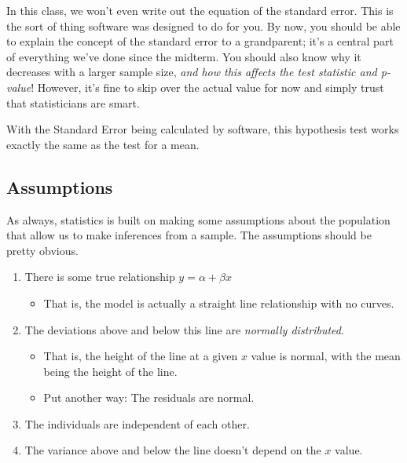 \documentclass[
  letterpaper,
  DIV=11,
  numbers=noendperiod]{scrreprt}
\providecommand{\tightlist}{%
  \setlength{\itemsep}{0pt}\setlength{\parskip}{0pt}}\usepackage{longtable,booktabs,array}
\begin{document}
In this class, we won't even write out the equation of the standard
error. This is the sort of thing software was designed to do for you. By
now, you should be able to explain the concept of the standard error to
a grandparent; it's a central part of everything we've done since the
midterm. You should also know why it decreases with a larger sample
size, \emph{and how this affects the test statistic and p-value}!
However, it's fine to skip over the actual value for now and simply
trust that statisticians are smart.

With the Standard Error being calculated by software, this hypothesis
test works exactly the same as the test for a mean.

\hypertarget{assumptions-1}{%
\subsection{Assumptions}\label{assumptions-1}}

As always, statistics is built on making some assumptions about the
population that allow us to make inferences from a sample. The
assumptions should be pretty obvious.

\begin{tcolorbox}[enhanced jigsaw, toptitle=1mm, colbacktitle=quarto-callout-note-color!10!white, breakable, leftrule=.75mm, left=2mm, opacityback=0, colframe=quarto-callout-note-color-frame, rightrule=.15mm, toprule=.15mm, bottomtitle=1mm, titlerule=0mm, title=\textcolor{quarto-callout-note-color}{\faInfo}\hspace{0.5em}{Linear Regression Assumptions}, arc=.35mm, colback=white, bottomrule=.15mm, opacitybacktitle=0.6, coltitle=black]

\begin{enumerate}
\def\labelenumi{\arabic{enumi}.}
\tightlist
\item
  There is some true relationship \(y = \alpha + \beta x\)

  \begin{itemize}
  \tightlist
  \item
    That is, the model is actually a straight line relationship with no
    curves.
  \end{itemize}
\item
  The deviations above and below this line are \emph{normally
  distributed}.

  \begin{itemize}
  \tightlist
  \item
    That is, the height of the line at a given \(x\) value is normal,
    with the mean being the height of the line.
  \item
    Put another way: The residuals are normal.
  \end{itemize}
\item
  The individuals are independent of each other.
\item
  The variance above and below the line doesn't depend on the \(x\)
  value.
\end{enumerate}

\end{tcolorbox}
\end{document}
